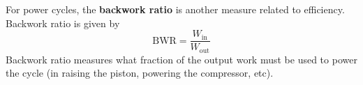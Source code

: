 For power cycles, the \textbf{backwork ratio} is another measure related to efficiency. Backwork ratio is given by \[\text{BWR} = \frac{W_\text{in}}{W_\text{out}}\] Backwork ratio measures what fraction of the output work must be used to power the cycle (in raising the piston, powering the compressor, etc).